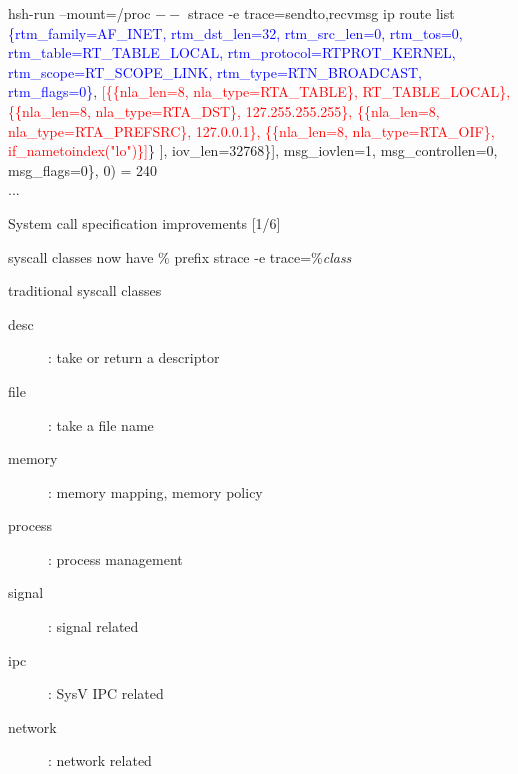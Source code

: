 \documentclass[unicode]{beamer}
\begin{document}
\begin{frame}[fragile]{\small hsh-run --mount=/proc $--$ strace -e trace=sendto,recvmsg ip route list}
{{ \textcolor{blue}{\{rtm\_family=AF\_INET, rtm\_dst\_len=32, rtm\_src\_len=0, rtm\_tos=0, rtm\_table=RT\_TABLE\_LOCAL, rtm\_protocol=RTPROT\_KERNEL, rtm\_scope=RT\_SCOPE\_LINK, rtm\_type=RTN\_BROADCAST, rtm\_flags=0\}},
  \textcolor{red}{[\{\{nla\_len=8, nla\_type=RTA\_TABLE\}, RT\_TABLE\_LOCAL\}, \{\{nla\_len=8, nla\_type=RTA\_DST\}, 127.255.255.255\}, \{\{nla\_len=8, nla\_type=RTA\_PREFSRC\}, 127.0.0.1\}, \{\{nla\_len=8, nla\_type=RTA\_OIF\}, if\_nametoindex("lo")\}]}\}}
], iov\_len=32768\}], msg\_iovlen=1, msg\_controllen=0, msg\_flags=0\}, 0) = 240 \\
...
}
\end{frame}

\begin{frame}[fragile]{System call specification improvements \hfill [1/6]}
\begin{block}{\large syscall classes now have \% prefix}
strace -e trace=\%\textit{class}
\end{block}
\begin{block}{\large traditional syscall classes}
\begin{description}
	\item[desc]: take or return a descriptor
	\item[file]: take a file name
	\item[memory]: memory mapping, memory policy
	\item[process]: process management
	\item[signal]: signal related
	\item[ipc]: SysV IPC related
	\item[network]: network related
\end{description}
\end{block}
\end{frame}
\end{document}
